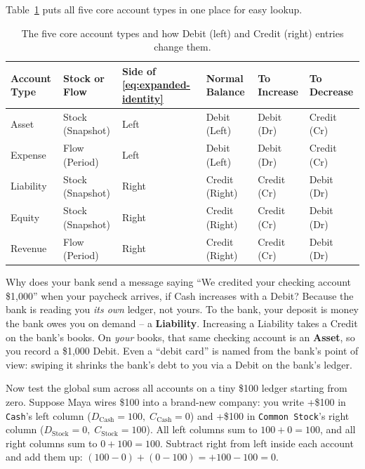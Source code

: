 Table~\ref{tab:ch01-five-accounts} puts all five core account types in one place for easy lookup.

\begin{table}[htbp]
\centering
\small
\begin{tabular}{@{}llllll@{}}
\toprule
\textbf{Account Type} & \textbf{Stock or Flow} & \textbf{Side of \eqref{eq:expanded-identity}} & \textbf{Normal Balance} & \textbf{To Increase} & \textbf{To Decrease} \\
\midrule
Asset     & Stock (Snapshot) & Left  & Debit (Left)   & Debit (Dr)  & Credit (Cr) \\
Expense   & Flow (Period)    & Left  & Debit (Left)   & Debit (Dr)  & Credit (Cr) \\
Liability & Stock (Snapshot) & Right & Credit (Right) & Credit (Cr) & Debit (Dr)  \\
Equity    & Stock (Snapshot) & Right & Credit (Right) & Credit (Cr) & Debit (Dr)  \\
Revenue   & Flow (Period)    & Right & Credit (Right) & Credit (Cr) & Debit (Dr)  \\
\bottomrule
\end{tabular}
\caption{The five core account types and how Debit (left) and Credit (right) entries change them.}
\label{tab:ch01-five-accounts}
\end{table}

\begin{trapbox}
Why does your bank send a message saying ``We credited your checking account \$1,000'' when your paycheck arrives, if Cash increases with a Debit? Because the bank is reading you \emph{its own} ledger, not yours. To the bank, your deposit is money the bank owes you on demand -- a \textbf{Liability}. Increasing a Liability takes a Credit on the bank's books. On \emph{your} books, that same checking account is an \textbf{Asset}, so you record a \$1,000 Debit. Even a ``debit card'' is named from the bank's point of view: swiping it shrinks the bank's debt to you via a Debit on the bank's ledger.
\end{trapbox}

Now test the global sum across all accounts on a tiny \$100 ledger starting from zero. Suppose Maya wires \$100 into a brand-new company: you write +\$100 in \texttt{Cash}'s left column ($D_{\text{Cash}} = 100,\; C_{\text{Cash}} = 0$) and +\$100 in \texttt{Common Stock}'s right column ($D_{\text{Stock}} = 0,\; C_{\text{Stock}} = 100$). All left columns sum to $100 + 0 = 100$, and all right columns sum to $0 + 100 = 100$. Subtract right from left inside each account and add them up: $(100 - 0) + (0 - 100) = +100 - 100 = 0$.

